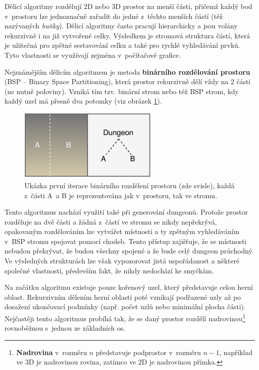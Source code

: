 Dělicí algoritmy rozdělují 2D nebo 3D prostor na menší části, přičemž každý bod v~prostoru lze jednoznačně zařadit do jedné z~těchto menších částí (též nazývaných \textit{buňky}).
Dělicí algoritmy často pracují hierarchicky a jsou volány rekurzivně i na již vytvořené celky.
Výsledkem je stromová struktura částí, která je užitečná pro zpětné sestavování celku a také pro rychlé vyhledávání prvků.
Tyto vlastnosti se využívají zejména v~počítačové grafice.
\par
Nejznámějším dělicím algoritmem je metoda \textbf{binárního rozdělování prostoru} (BSP -- Binary Space Partitioning), která prostor rekurzivně dělí vždy na 2 části (ne nutně poloviny).
Vzniká tím tzv. binární strom nebo též BSP strom, kdy každý uzel má přesně dva potomky (viz obrázek \ref{img:bsp_first}).
\begin{figure}[hbt]
    \centering
    \includegraphics[width=0.6\textwidth]{obrazky/bsp_first.pdf}
    \caption{Ukázka první iterace binárního rozdělení prostoru (zde svisle), každá z~části A~a B je reprezentována jak v~prostoru, tak ve stromu.}
    \label{img:bsp_first}
\end{figure}
Tento algoritmus nachází využití také při generování dungeonů.
Protože prostor rozděluje na dvě části a žádná z~částí ve stromu se nikdy nepřekrývá, opakovaným rozdělováním lze vytvářet místnosti a ty zpětným vyhledáváním v~BSP stromu spojovat pomocí chodeb.
Tento přístup zajišťuje, že se místnosti nebudou překrývat, že budou všechny spojené a že bude celý dungeon průchodný.
Ve výsledných strukturách lze však vypozorovat jistá uspořádanost a některé společné vlastnosti, především fakt, že nikdy nedochází ke smyčkám.
\par
Na začátku algoritmu existuje pouze kořenový uzel, který představuje celou herní oblast.
Rekurzivním dělením herní oblasti poté vznikají podřazené uzly až po dosažení ukončovací podmínky (např. počet uzlů nebo minimální plocha části).
Nejčastěji tento algoritmus probíhá tak, že se daný prostor rozdělí nadrovinou\footnote{\textbf{Nadrovina} v~rozměru $n$ představuje podprostor v~rozměru $n-1$, například ve 3D je nadrovinou rovina, zatímco ve 2D je nadrovinou přímka.} rovnoběžnou s~jednou ze základních os.
